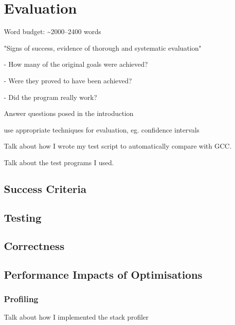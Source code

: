 \documentclass[00-main.tex]{subfiles}
\begin{document}
\chapter{Evaluation}

\begin{Comment}
Word budget: \textasciitilde 2000--2400 words
\end{Comment}

\begin{Comment}
"Signs of success, evidence of thorough and systematic evaluation"

- How many of the original goals were achieved?

- Were they proved to have been achieved?

- Did the program really work?

Answer questions posed in the introduction

use appropriate techniques for evaluation, eg. confidence intervals
\end{Comment}

\begin{Comment}
Talk about how I wrote my test script to automatically compare with GCC.

Talk about the test programs I used.
\end{Comment}


\section{Success Criteria}

\section{Testing}

\section{Correctness}

\section{Performance Impacts of Optimisations}

\subsection{Profiling}

\begin{Comment}
Talk about how I implemented the stack profiler
\end{Comment}
\end{document}

